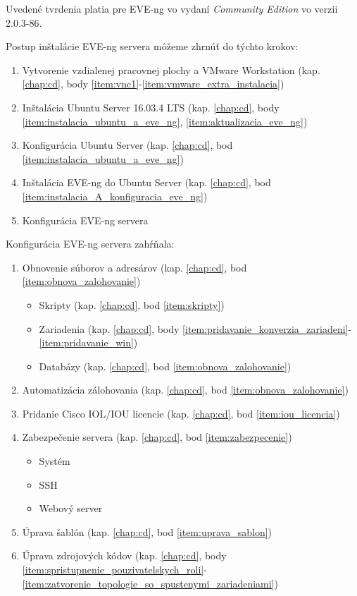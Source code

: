\noindent
Uvedené tvrdenia platia pre EVE-ng vo vydaní \emph{Community Edition} vo verzii 2.0.3-86.

\noindent
Postup inštalácie EVE-ng servera môžeme zhrnúť do týchto krokov:

\begin{enumerate}[noitemsep]
    \item Vytvorenie vzdialenej pracovnej plochy a VMware Workstation (kap. \ref{chap:cd}, body \ref{item:vnc1}-\ref{item:vmware_extra_instalacia})
    \item Inštalácia Ubuntu Server 16.03.4 LTS (kap. \ref{chap:cd}, body \ref{item:instalacia_ubuntu_a_eve_ng}, \ref{item:aktualizacia_eve_ng})
    \item Konfigurácia Ubuntu Server (kap. \ref{chap:cd}, bod \ref{item:instalacia_ubuntu_a_eve_ng})
    \item Inštalácia EVE-ng do Ubuntu Server (kap. \ref{chap:cd}, bod \ref{item:instalacia_A_konfiguracia_eve_ng})
    \item Konfigurácia EVE-ng servera
\end{enumerate}

\noindent   
Konfigurácia EVE-ng servera zahŕňala:

\begin{enumerate}[noitemsep]
    \item Obnovenie súborov a adresárov (kap. \ref{chap:cd}, bod \ref{item:obnova_zalohovanie})
    \begin{itemize}[noitemsep]
        \item Skripty (kap. \ref{chap:cd}, bod \ref{item:skripty})
        \item Zariadenia (kap. \ref{chap:cd}, body \ref{item:pridavanie_konverzia_zariadeni}-\ref{item:pridavanie_win})
        \item Databázy (kap. \ref{chap:cd}, bod \ref{item:obnova_zalohovanie})
    \end{itemize}
    \item Automatizácia zálohovania (kap. \ref{chap:cd}, bod \ref{item:obnova_zalohovanie})
    \item Pridanie Cisco IOL/IOU licencie (kap. \ref{chap:cd}, bod \ref{item:iou_licencia})
    \item Zabezpečenie servera (kap. \ref{chap:cd}, bod \ref{item:zabezpecenie})
    \begin{itemize}[noitemsep]
        \item Systém
        \item SSH
        \item Webový server
    \end{itemize}
    \item Úprava šablón (kap. \ref{chap:cd}, bod \ref{item:uprava_sablon})
    \item Úprava zdrojových kódov (kap. \ref{chap:cd}, body \ref{item:spristupnenie_pouzivatelskych_roli}-\ref{item:zatvorenie_topologie_so_spustenymi_zariadeniami})
\end{enumerate}

